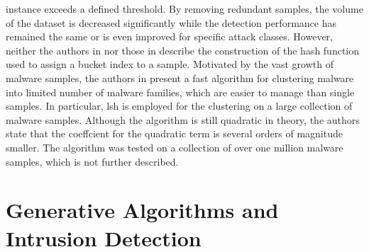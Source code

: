 \documentclass[../../main.tex]{subfiles}
\begin{document}
instance exceeds a defined threshold. By removing redundant samples, the volume of the dataset is decreased significantly while the detection performance has remained the same or is even improved for specific attack classes. However, neither the authors in \cite{baldini2021intrusion} nor those in \cite{aslani2020fast} describe the construction of the hash function used to assign a bucket index to a sample. Motivated by the vast growth of malware samples, the authors in \cite{opricsa2014locality} present a fast algorithm for clustering malware into limited number of malware families, which are easier to manage than single samples. In particular, \gls{lsh} is employed for the clustering on a large collection of malware samples. Although the algorithm is still quadratic in theory, the authors state that the coeffcient for the quadratic term is several orders of magnitude smaller. The algorithm was tested on a collection of over one million malware samples, which is not further described.

\section{Generative Algorithms and Intrusion Detection}\label{sec:generative_algorithms_ids}
\end{document}
